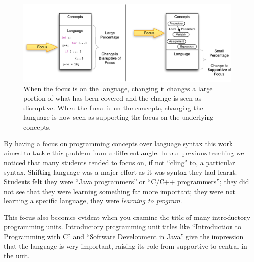 \begin{figure}[htbp]
	\centering
	\includegraphics[width=\textwidth]{LanguageFocus}
	\caption{When the focus is on the language, changing it changes a large portion of what has been covered and the change is seen as disruptive. When the focus is on the concepts, changing the language is now seen as supporting the focus on the underlying concepts.}
	\label{fig:lang_focus}
\end{figure}

By having a focus on programming concepts over language syntax this work aimed to tackle this problem from a different angle. In our previous teaching we noticed that many students tended to focus on, if not ``cling'' to, a particular syntax. Shifting language was a major effort as it was syntax they had learnt. Students felt they were ``Java programmers'' or ``C/C++ programmers''; they did not see that they were learning something far more important; they were not learning a specific language, they were \emph{learning to program}. 

This focus also becomes evident when you examine the title of many introductory programming units. Introductory programming unit titles like ``Introduction to Programming with C'' and ``Software Development in Java'' give the impression that the language is very important, raising its role from supportive to central in the unit.

%
% 
% 
% 


